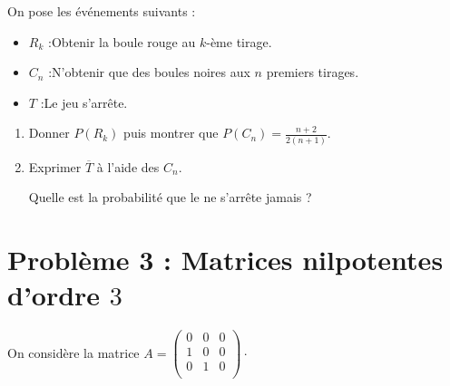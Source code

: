 \documentclass[twoside,french,11pt]{VcCours}
\begin{document}
\begin{enumerate}
        On pose les événements suivants :
        \begin{itemize}
          \item $R_k$ :\og{}Obtenir la boule rouge au $k$-ème tirage.\fg{}
          \item $C_n$ :\og{}N'obtenir que des boules noires aux $n$ premiers tirages.\fg{}
          \item $T$ :\og{}Le jeu s'arrête.\fg{}
        \end{itemize}
        \begin{enumerate}
          \item Donner $P(R_k)$ puis montrer que $P(C_n)=\frac{n+2}{2(n+1)}$.

          \item Exprimer $\overline{T}$ à l'aide des $C_n$.

                Quelle est la probabilité que le ne s'arrête jamais ?
        \end{enumerate}
      \end{enumerate}

\section*{Problème 3 : Matrices nilpotentes d'ordre $3$}
  On considère la matrice $A = \begin{pmatrix}
  0 & 0 & 0 \\
  1 & 0 & 0 \\
  0 & 1 & 0 \\
  \end{pmatrix} \cdot$
  
\end{document}

